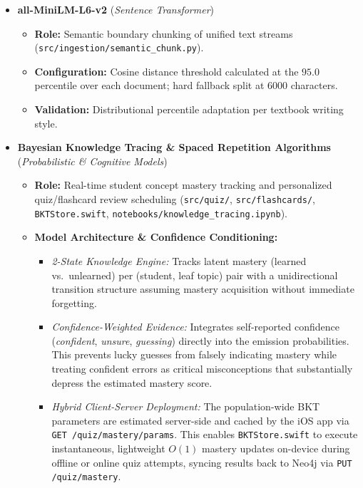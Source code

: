 {\begin{itemize}
    \item \textbf{all-MiniLM-L6-v2} (\textit{Sentence Transformer})
    \begin{itemize}
        \item \textbf{Role:} Semantic boundary chunking of unified text streams (\texttt{src/ingestion/semantic\_chunk.py}).
        \item \textbf{Configuration:} Cosine distance threshold calculated at the $95.0$ percentile over each document; hard fallback split at 6000 characters.
        \item \textbf{Validation:} Distributional percentile adaptation per textbook writing style.
    \end{itemize}

    \item \textbf{Bayesian Knowledge Tracing \& Spaced Repetition Algorithms} (\textit{Probabilistic \& Cognitive Models})
    \begin{itemize}
        \item \textbf{Role:} Real-time student concept mastery tracking and personalized quiz/flashcard review scheduling (\texttt{src/quiz/}, \texttt{src/flashcards/}, \texttt{BKTStore.swift}, \texttt{notebooks/knowledge\_tracing.ipynb}).
        \item \textbf{Model Architecture \& Confidence Conditioning:}
        \begin{itemize}[itemsep=1pt,topsep=1pt]
            \item \textit{2-State Knowledge Engine:} Tracks latent mastery (learned vs.\ unlearned) per (student, leaf topic) pair with a unidirectional transition structure assuming mastery acquisition without immediate forgetting.
            \item \textit{Confidence-Weighted Evidence:} Integrates self-reported confidence (\textit{confident}, \textit{unsure}, \textit{guessing}) directly into the emission probabilities. This prevents lucky guesses from falsely indicating mastery while treating confident errors as critical misconceptions that substantially depress the estimated mastery score.
            \item \textit{Hybrid Client-Server Deployment:} The population-wide BKT parameters are estimated server-side and cached by the iOS app via \texttt{GET /quiz/mastery/params}. This enables \texttt{BKTStore.swift} to execute instantaneous, lightweight $O(1)$ mastery updates on-device during offline or online quiz attempts, syncing results back to Neo4j via \texttt{PUT /quiz/mastery}.
        \end{itemize}

\end{itemize}
\end{itemize}}
